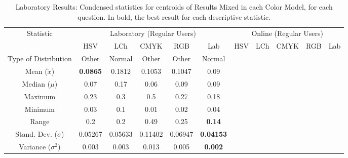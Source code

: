 %
\begin{table}[htbp]
  \resizebox{\textwidth}{!} {
  \begin{tabular}{@{}ccccccccccc@{}}
    \toprule
    \multirow{2}{*}{Statistic}                 & \multicolumn{5}{c}{Laboratory (Regular Users)}                                   & \multicolumn{5}{c}{Online (Regular Users)}     \\ \cmidrule(l){2-11}
                                               & HSV             & LCh    & CMYK   & RGB    & \multicolumn{1}{c|}{Lab}            & HSV & LCh & CMYK & RGB & Lab                   \\ \midrule
    \multicolumn{1}{|c|}{Type of Distribution} & Other           & Normal & Other  & Other  & \multicolumn{1}{c|}{Normal}         &     &     &      &     & \multicolumn{1}{c|}{} \\
    \multicolumn{1}{|c|}{Mean ($\tilde{x}$)}   & \textbf{0.0865} & 0.1812 & 0.1053 & 0.1047 & \multicolumn{1}{c|}{0.09}           &     &     &      &     & \multicolumn{1}{c|}{} \\
    \multicolumn{1}{|c|}{Median ($\mu$)}       & 0.07            & 0.17   & 0.06   & 0.09   & \multicolumn{1}{c|}{0.09}           &     &     &      &     & \multicolumn{1}{c|}{} \\
    \multicolumn{1}{|c|}{Maximum}              & 0.23            & 0.3    & 0.5    & 0.27   & \multicolumn{1}{c|}{0.18}           &     &     &      &     & \multicolumn{1}{c|}{} \\
    \multicolumn{1}{|c|}{Minimum}              & 0.03            & 0.1    & 0.01   & 0.02   & \multicolumn{1}{c|}{0.04}           &     &     &      &     & \multicolumn{1}{c|}{} \\
    \multicolumn{1}{|c|}{Range}                & 0.2             & 0.2    & 0.49   & 0.25   & \multicolumn{1}{c|}{\textbf{0.14}}  &     &     &      &     & \multicolumn{1}{c|}{} \\
    \multicolumn{1}{|c|}{Stand. Dev. ($\sigma$)}& 0.05267           & 0.05633  & 0.11402  & 0.06947  & \multicolumn{1}{c|}{\textbf{0.04153}} &     &     &      &     & \multicolumn{1}{c|}{} \\
    \multicolumn{1}{|c|}{Variance ($\sigma^2$)}& 0.003           & 0.003  & 0.013  & 0.005  & \multicolumn{1}{c|}{\textbf{0.002}} &     &     &      &     & \multicolumn{1}{c|}{} \\ \bottomrule
    \end{tabular}}
  \caption[Laboratory Results: Condensed statistics for centroids of Results Mixed in each Color Model]{Laboratory Results: Condensed statistics for centroids of Results Mixed in each Color Model, for each question. In bold, the best result for each descriptive statistic.}
  \label{table:colormodels_centroids_statistics}
\end{table}
